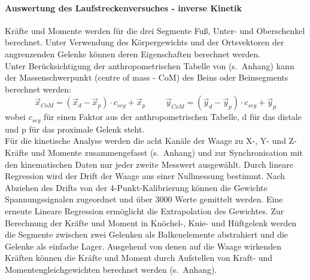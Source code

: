\paragraph{Auswertung des Laufstreckenversuches - inverse Kinetik}
Kräfte und Momente werden für die drei Segmente Fuß, Unter- und Oberschenkel berechnet. Unter Verwendung des Körpergewichts und der Ortsvektoren der angrenzenden Gelenke können deren Eigenschaften berechnet werden.\\
Unter Berücksichtigung der anthropometrischen Tabelle von \textcite{winter2009biomechanics} (s.~Anhang) kann der Massenschwerpunkt (centre of mass - CoM) des Beins oder Beinsegments berechnet werden:
\begin{equation}
\vec{x}_{CoM} = (\vec{x}_d - \vec{x}_p) \cdot c_{seg} + \vec{x}_p \hspace{1cm} \vec{y}_{CoM} = (\vec{y}_d - \vec{y}_p) \cdot c_{seg} + \vec{y}_p
\label{eq:CoM_x}
\end{equation}
wobei $c_{seg}$ für einen Faktor aus der anthropometrischen Tabelle, d für das distale und p für das proximale Gelenk steht.\\
Für die kinetische Analyse werden die acht Kanäle der Waage zu X-, Y- und Z-Kräfte und Momente zusammengefasst (s.~Anhang) und zur Synchronisation mit den kinematischen Daten nur jeder zweite Messwert ausgewählt. Durch lineare Regression wird der Drift der Waage aus einer Nullmessung bestimmt. Nach Abziehen des Drifts von der 4-Punkt-Kalibrierung können die Gewichte Spannungssignalen zugeordnet und über 3000 Werte gemittelt werden. Eine erneute Lineare Regression ermöglicht die Extrapolation des Gewichtes.
Zur Berechnung der Kräfte und Moment in Knöchel-, Knie- und Hüftgelenk werden die Segmente zwischen zwei Gelenken als Balkenelemente abstrahiert und die Gelenke als einfache Lager. Ausgehend von denen auf die Waage wirkenden Kräften können die Kräfte und Moment durch Aufstellen von Kraft- und Momentengleichgewichten berechnet werden (s.~Anhang).